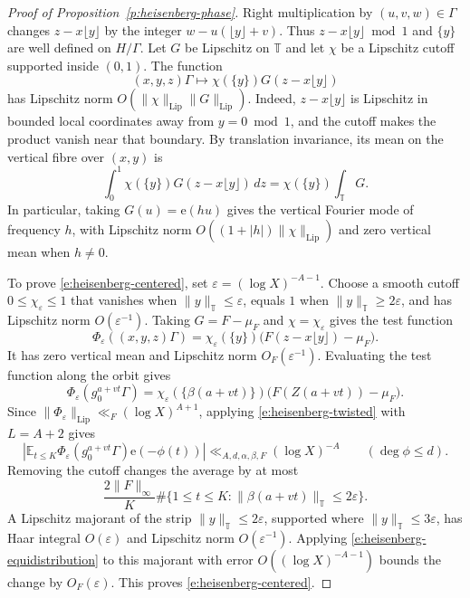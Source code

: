 \documentclass[12pt]{amsart}
\newcommand{\1}{\mathbf 1}
\newcommand{\e}{\mathrm e}
\theoremstyle{definition}
\begin{document}
\begin{proof}[Proof of Proposition~\ref{p:heisenberg-phase}]
Right multiplication by $(u,v,w)\in\Gamma$ changes
$z-x\lfloor y\rfloor$ by the integer
$w-u(\lfloor y\rfloor+v)$. Thus $z-x\lfloor y\rfloor\bmod 1$
and $\{y\}$ are well defined on $H/\Gamma$.
Let \(G\) be Lipschitz on \(\mathbb T\) and let \(\chi\) be a
Lipschitz cutoff supported inside \((0,1)\). The function
\[
 (x,y,z)\Gamma\longmapsto
 \chi(\{y\})G(z-x\lfloor y\rfloor)
\]
has Lipschitz norm \(O(\|\chi\|_{\mathrm{Lip}}\|G\|_{\mathrm{Lip}})\).
Indeed, \(z-x\lfloor y\rfloor\) is Lipschitz in bounded local
coordinates away from \(y=0\bmod 1\), and the cutoff makes the
product vanish near that boundary. By translation invariance,
its mean on the vertical fibre over \((x,y)\) is
\[
 \int_0^1\chi(\{y\})G(z-x\lfloor y\rfloor)\,dz
 =\chi(\{y\})\int_{\mathbb T}G.
\]
In particular, taking \(G(u)=\e(hu)\) gives the vertical Fourier
mode of frequency \(h\), with Lipschitz norm
\(O((1+|h|)\|\chi\|_{\mathrm{Lip}})\) and zero vertical mean
when \(h\ne0\).

To prove \eqref{e:heisenberg-centered}, set
\(\varepsilon=(\log X)^{-A-1}\). Choose a smooth cutoff
\(0\leq\chi_\varepsilon\leq1\) that vanishes when
\(\|y\|_{\mathbb T}\leq\varepsilon\), equals \(1\) when
\(\|y\|_{\mathbb T}\geq2\varepsilon\), and has Lipschitz norm
\(O(\varepsilon^{-1})\). Taking \(G=F-\mu_F\) and
\(\chi=\chi_\varepsilon\) gives the test function
\[
 \Phi_\varepsilon((x,y,z)\Gamma)
 =\chi_\varepsilon(\{y\})
  \bigl(F(z-x\lfloor y\rfloor)-\mu_F\bigr).
\]
It has zero vertical mean and Lipschitz norm
\(O_F(\varepsilon^{-1})\).
Evaluating the test function along the orbit gives
\[
 \Phi_\varepsilon(g_0^{a+vt}\Gamma)
 =\chi_\varepsilon(\{\beta(a+vt)\})
  \bigl(F(Z(a+vt))-\mu_F\bigr).
\]
Since $\|\Phi_\varepsilon\|_{\mathrm{Lip}}
\ll_F(\log X)^{A+1}$, applying \eqref{e:heisenberg-twisted} with $L=A+2$ gives
\[
 \left|\mathbb E_{t\leq K}
   \Phi_\varepsilon(g_0^{a+vt}\Gamma)\e(-\phi(t))\right|
 \ll_{A,d,\alpha,\beta,F}(\log X)^{-A}
 \qquad (\deg\phi\leq d).
\]
Removing the cutoff changes the average by at most
\[
 \frac{2\|F\|_\infty}{K}
 \#\bigl\{1\leq t\leq K:
          \|\beta(a+vt)\|_{\mathbb T}\leq2\varepsilon\bigr\}.
\]
A Lipschitz majorant of the strip
\(\|y\|_{\mathbb T}\leq2\varepsilon\), supported where
\(\|y\|_{\mathbb T}\leq3\varepsilon\), has Haar integral
\(O(\varepsilon)\) and Lipschitz norm \(O(\varepsilon^{-1})\).
Applying \eqref{e:heisenberg-equidistribution} to this majorant
with error \(O((\log X)^{-A-1})\) bounds the change by
\(O_F(\varepsilon)\). This proves
\eqref{e:heisenberg-centered}.
\end{proof}
\end{document}
